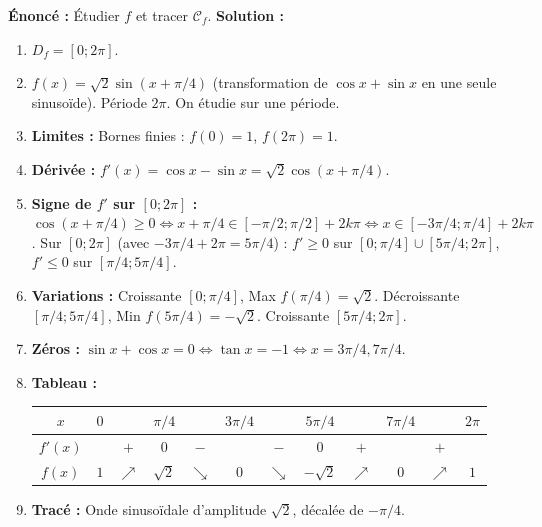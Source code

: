 \documentclass[11pt]{article}
\begin{document}
\begin{exoresolu}[{Étude complète : Fonction trigonométrique $f(x) = \sin x + \cos x$ sur $[0; 2\pi]$}]
\textbf{Énoncé :} Étudier $f$ et tracer $\mathcal{C}_f$.
\tcblower
\textbf{Solution :}
\begin{enumerate}
  \item $D_f = [0; 2\pi]$.
  \item $f(x) = \sqrt{2}\sin(x+\pi/4)$ (transformation de $\cos x + \sin x$ en une seule sinusoïde). Période $2\pi$. On étudie sur une période.
  \item \textbf{Limites :} Bornes finies : $f(0)=1$, $f(2\pi)=1$.
  \item \textbf{Dérivée :} $f'(x) = \cos x - \sin x = \sqrt{2}\cos(x+\pi/4)$.
  \item \textbf{Signe de $f'$ sur $[0;2\pi]$ :} $\cos(x+\pi/4) \ge 0 \iff x+\pi/4 \in [-\pi/2; \pi/2] + 2k\pi \iff x \in [-3\pi/4; \pi/4] + 2k\pi$.
    Sur $[0;2\pi]$ (avec $-3\pi/4 + 2\pi = 5\pi/4$) : $f' \ge 0$ sur $[0; \pi/4] \cup [5\pi/4; 2\pi]$, $f' \le 0$ sur $[\pi/4; 5\pi/4]$.
  \item \textbf{Variations :}
    Croissante $[0;\pi/4]$, Max $f(\pi/4)=\sqrt{2}$.
    Décroissante $[\pi/4; 5\pi/4]$, Min $f(5\pi/4)=-\sqrt{2}$.
    Croissante $[5\pi/4; 2\pi]$.
  \item \textbf{Zéros :} $\sin x + \cos x = 0 \iff \tan x = -1 \iff x = 3\pi/4, 7\pi/4$.
  \item \textbf{Tableau :}
  \begin{center}
  \begin{tabular}{|c|ccccccccccc|}
  \hline
  $x$ & $0$ & & $\pi/4$ & & $3\pi/4$ & & $5\pi/4$ & & $7\pi/4$ & & $2\pi$ \\
  \hline
  $f'(x)$ & & $+$ & $0$ & $-$ & & $-$ & $0$ & $+$ & & $+$ & \\
  \hline
  $f(x)$ & $1$ & $\nearrow$ & $\sqrt{2}$ & $\searrow$ & $0$ & $\searrow$ & $-\sqrt{2}$ & $\nearrow$ & $0$ & $\nearrow$ & $1$ \\
  \hline
  \end{tabular}
  \end{center}
  \item \textbf{Tracé :} Onde sinusoïdale d'amplitude $\sqrt{2}$, décalée de $-\pi/4$.
\end{enumerate}
\end{exoresolu}
\end{document}
